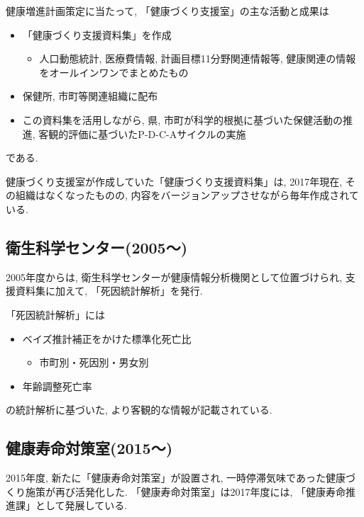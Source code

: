 健康増進計画策定に当たって, 「健康づくり支援室」の主な活動と成果は
\begin{itemize} \setlength{\itemsep}{-0.5mm} \setlength{\parskip}{-0.5mm}
	\item 「健康づくり支援資料集」を作成
	      \begin{itemize} \setlength{\itemsep}{-0.5mm} \setlength{\parskip}{-0.5mm}
		      \item 人口動態統計, 医療費情報, 計画目標11分野関連情報等, 健康関連の情報をオールインワンでまとめたもの
	      \end{itemize}
	\item 保健所, 市町等関連組織に配布
	\item この資料集を活用しながら, 県, 市町が科学的根拠に基づいた保健活動の推進, 客観的評価に基づいたP-D-C-Aサイクルの実施
\end{itemize}
である.

健康づくり支援室が作成していた「健康づくり支援資料集」は, 2017年現在, その組織はなくなったものの,
内容をバージョンアップさせながら毎年作成されている.

\subsection{衛生科学センター(2005〜)}

2005年度からは, 衛生科学センターが健康情報分析機関として位置づけられ, 支援資料集に加えて,
「死因統計解析」を発行.

「死因統計解析」には
\begin{itemize} \setlength{\itemsep}{-0.5mm} \setlength{\parskip}{-0.5mm}
	\item ベイズ推計補正をかけた標準化死亡比
	      \begin{itemize} \setlength{\itemsep}{-0.5mm} \setlength{\parskip}{-0.5mm}
		      \item 市町別・死因別・男女別
	      \end{itemize}
	\item 年齢調整死亡率
\end{itemize}
の統計解析に基づいた, より客観的な情報が記載されている.

\subsection{健康寿命対策室(2015〜)}
2015年度, 新たに「健康寿命対策室」が設置され, 一時停滞気味であった健康づくり施策が再び活発化した. 	「健康寿命対策室」は2017年度には, 「健康寿命推進課」として発展している.

